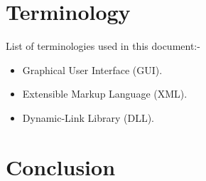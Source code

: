 \documentclass[conference]{IEEEtran}
\begin{document}
    \section{Terminology}
      List of terminologies used in this document:-
      \begin{itemize}
        \item Graphical User Interface (GUI).
        \item Extensible Markup Language (XML).
        \item Dynamic-Link Library (DLL).
      \end{itemize}

    \section{Conclusion}
    
	\nocite{*}
	\renewcommand\refname{\section{Reference List}}
	\small{
    }
\end{document}
